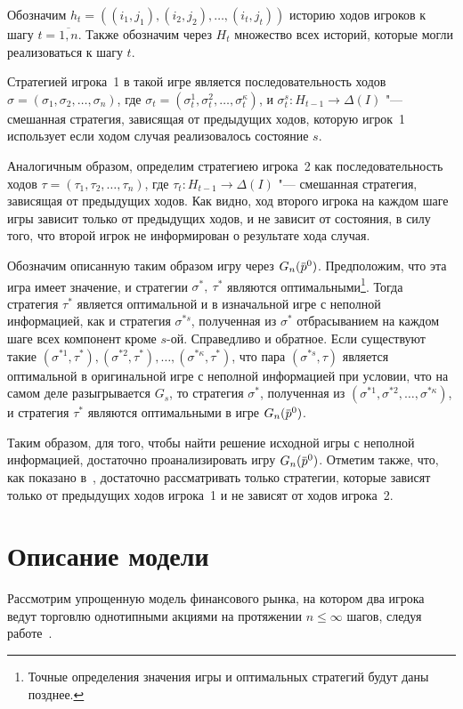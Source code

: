 {Обозначим %
$h_t = \left((i_1, j_1), (i_2, j_2), \ldots, (i_t, j_t)\right)$ %
историю ходов игроков к шагу $t = \overline{1, n}$. Также обозначим через $H_t$
множество всех историй, которые могли реализоваться к шагу $t$. 

Стратегией игрока~1 в такой игре является последовательность ходов %
$\sigma = (\sigma_1, \sigma_2, \ldots, \sigma_n)$, где %
$\sigma_t = (\sigma^1_t, \sigma^2_t, \ldots, \sigma^\kappa_t)$, и %
$\sigma^s_t: H_{t-1} \rightarrow \Delta(I)$ "--- смешанная стратегия, зависящая
от предыдущих ходов, которую игрок~1 использует если ходом случая реализовалось
состояние $s$.

Аналогичным образом, определим стратегиею игрока~2 как последовательность
ходов %
$\tau = (\tau_1, \tau_2, \ldots, \tau_n)$, где %
$\tau_t: H_{t-1} \rightarrow \Delta(I)$ "--- смешанная стратегия, зависящая от
предыдущих ходов. Как видно, ход второго игрока на каждом шаге игры зависит
только от предыдущих ходов, и не зависит от состояния, в силу того, что второй
игрок не информирован о результате хода случая.

Обозначим описанную таким образом игру через $G_n(\po)$. Предположим, что эта
игра имеет значение, и стратегии $\sigma^*,\ \tau^*$ являются
оптимальными\footnote{Точные определения значения игры и оптимальных стратегий
  будут даны позднее.}. Тогда стратегия $\tau^*$ является оптимальной и в
изначальной игре с неполной информацией, как и стратегия $\sigma^{*s}$,
полученная из $\sigma^*$ отбрасыванием на каждом шаге всех компонент кроме
$s$-ой. Справедливо и обратное. Если существуют такие %
$(\sigma^{*1}, \tau^*), (\sigma^{*2}, \tau^*), \ldots, (\sigma^{*\kappa},
\tau^*)$, %
что пара $(\sigma^{*s}, \tau)$ является оптимальной в оригинальной игре с
неполной информацией при условии, что на самом деле разыгрывается $G_s$, то
стратегия $\sigma^*$, полученная из %
$(\sigma^{*1}, \sigma^{*2}, \ldots, \sigma^{*\kappa})$, и стратегия $\tau^*$
являются оптимальными в игре $G_n(\po)$.

Таким образом, для того, чтобы найти решение исходной игры с неполной
информацией, достаточно проанализировать игру $G_n(\po)$. Отметим также, что,
как показано в~\cite{aumann95}, достаточно рассматривать только стратегии,
которые зависят только от предыдущих ходов игрока~1 и не зависят от ходов
игрока~2.

\section{Описание модели}\label{ch1:model}
Рассмотрим упрощенную модель финансового рынка, на котором два игрока ведут
торговлю однотипными акциями на протяжении $n \leqslant \infty$ шагов, следуя
работе~\cite{domansky07}.

}
